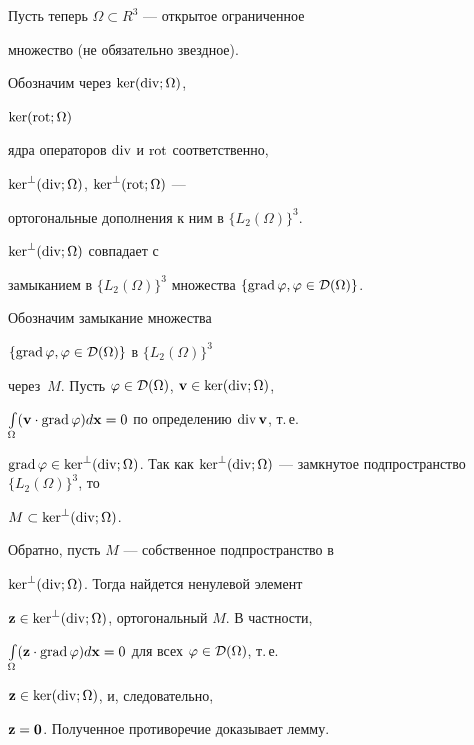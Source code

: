 Пусть теперь $\Omega\subset R^3$ --- открытое ограниченное


множество (не обязательно звездное).





Обозначим через $\ker(\operatorname{div};\Omega)$,


$\ker(\operatorname{rot};\Omega)$


ядра операторов $\operatorname{div}$ и $\operatorname{rot}$ соответственно,


$\ker^{\bot}(\operatorname{div};\Omega)$, $\ker^{\bot}(\operatorname{rot};\Omega)$ ---


ортогональные дополнения к ним в $\{L_2(\Omega)\}^3$.





\begin{lems}\label{do}


$\ker^{\bot}(\operatorname{div};\Omega)$ совпадает с


замыканием в $\{L_2(\Omega)\}^3$ множества $\{


\Grad\varphi,\varphi\in{\cal D}(\Omega)\}$.


\end{lems}





\begin{pf}


Обозначим замыкание множества


$\{\operatorname{grad}\varphi,\varphi\in{\cal D}(\Omega)\}$ в $\{L_2(\Omega)\}^3$


че\-рез~$M$. Пусть $\varphi\in{\cal D}(\Omega)$, $\bold{v}\in\ker(\operatorname{div};\Omega)$,


$\int\limits_{\Omega}(\bold{v}\cdot 


\Grad\varphi)d\bold{x}=0$ по определению $\Div\bold{v}$, т.\,е.


$\Grad\varphi\in\ker^{\bot}(\Div;\Omega)$. Так как $\ker^{\bot}(


\Div;\Omega)$ --- замкнутое подпространство $\{L_2(\Omega)\}^3$, то


$M\subset\ker^{\bot}(\operatorname{div};\Omega)$.





Обратно, пусть $M$ --- собственное подпространство в


$\ker^{\bot}(\operatorname{div};\Omega)$. Тогда найдется ненулевой элемент


$\bold{z}\in\ker^{\bot}(\operatorname{div};\Omega)$, ортогональный $M$. В частности,


$\int\limits_{\Omega}(\bold{z}\cdot 


\Grad\varphi)d\bold{x}=0$ для всех $\varphi\in{\cal D}(\Omega)$, т.\,е.


$\bold{z}\in\ker(\operatorname{div};\Omega)$, и, следовательно,


$\bold{z}=\bold{0}$. Полученное противоречие доказывает лемму.


\end{pf}





